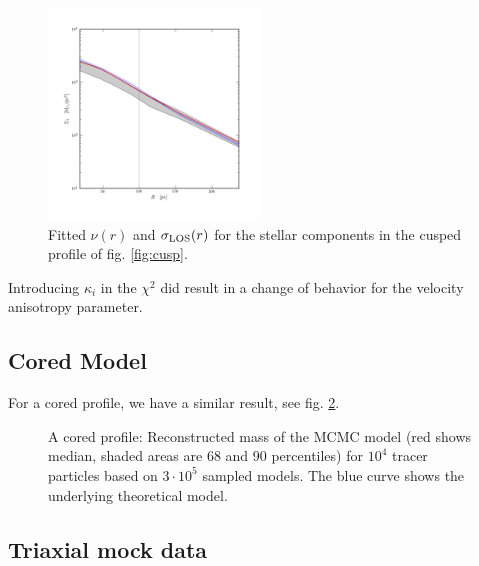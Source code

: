 \begin{figure}
    \begin{center}
        \hspace{-7mm}
        \includegraphics[width=0.5\textwidth]{fig/prof_nu.png}
        \caption{\label{fig:nusiglos} Fitted $\nu(r)$ and $\sigma_{\text{LOS}}(r)$ for
          the stellar components in the cusped profile of
          fig. \ref{fig:cusp}.}
    \end{center}
\end{figure}


Introducing $\kappa_i$ in the $\chi^2$ did  result in a
change of behavior for the velocity anisotropy parameter.



\subsection{Cored Model}
For a cored profile, we have a similar result, see fig. \ref{fig:core}. 

\begin{figure}
    \begin{center}
        \hspace{-7mm}
        \caption{A cored profile: Reconstructed mass of the MCMC model
          (red shows median, shaded areas are 68 and 90 percentiles)
          for $10^4$ tracer particles based on $3\cdot10^5$ sampled
          models. The blue curve shows the underlying theoretical
          model.}
        \label{fig:core}
    \end{center}
\end{figure}


\subsection{Triaxial mock data}

